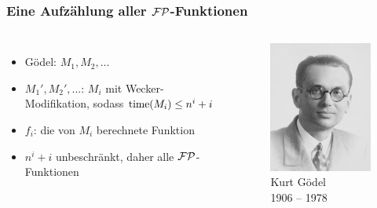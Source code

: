 \begin{frame}
  \frametitle{Eine Aufzählung aller \(\mathcal{FP}\)-Funktionen}

  \begin{columns}
      \begin{itemize}
        \item<2-> Gödel: \(M_1, M_2, ...\)
        \item<3-> \(M_1', M_2', ...\): \(M_i\) mit Wecker-Modifikation, sodass \(\operatorname{time}(M_i) \leq n^i + i\)
        \item<4-> \(f_i\): die von \(M_i\) berechnete Funktion
        \item<5-> \(n^i + i\) unbeschränkt, daher alle \(\mathcal{FP}\)-Funktionen
      \end{itemize}

      \begin{figure}
        \includegraphics[width=\textwidth]{Presentation/Images/KurtGoedel.jpg}
        \caption{Kurt Gödel \\ 1906 -- 1978}
      \end{figure}
  \end{columns}
\end{frame}

